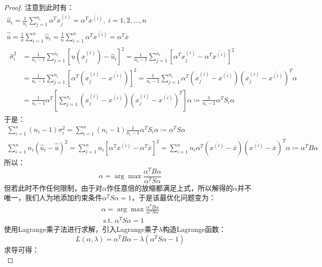 \begin{proof}
	注意到此时有：
	\begin{gather*}
		\hat{u}_i=\frac{1}{n_i}\sum_{j=1}^{n_i}\alpha^Tx^{(i)}_j=\alpha^T\overline{x^{(i)}},\;i=1,2,\dots,n \\
		\hat{\overline{u}}=\frac{1}{n}\sum_{i=1}^{n}\hat{u}_i=\frac{1}{n}\sum_{i=1}^{n}\alpha^T\overline{x^{(i)}}=\alpha^T\overline{x} \\
		\begin{aligned}
			\hat{\sigma}_i^2
			&=\frac{1}{n_i-1}\sum_{j=1}^{n_i}[u(x^{(i)}_j)-\hat{u}_i]^2=\frac{1}{n_i-1}\sum_{j=1}^{n_i}[\alpha^Tx^{(i)}_j-\alpha^T\overline{x^{(i)}}]^2 \\
			&=\frac{1}{n_i-1}\sum_{j=1}^{n_i}[\alpha^T(x^{(i)}_j-\overline{x^{(i)}})]^2=\frac{1}{n_i-1}\sum_{j=1}^{n_i}\alpha^T(x^{(i)}_j-\overline{x^{(i)}})(x^{(i)}_j-\overline{x^{(i)}})^T\alpha \\
			&=\frac{1}{n_i-1}\alpha^T\left[\sum_{j=1}^{n_i}(x^{(i)}_j-\overline{x^{(i)}})(x^{(i)}_j-\overline{x^{(i)}})^T\right]\alpha\coloneqq\frac{1}{n_i-1}\alpha^TS_i\alpha
		\end{aligned}
	\end{gather*}
	于是：
	\begin{gather*}
		\sum_{i=1}^{n}(n_i-1)\sigma_i^2=\sum_{i=1}^{n}(n_i-1)\frac{1}{n_i-1}\alpha^TS_i\alpha\coloneqq\alpha^TS\alpha \\
		\sum_{i=1}^{n}n_i(\hat{u}_i-\hat{\overline{u}})^2=\sum_{i=1}^{n}n_i[\alpha^T\overline{x^{(i)}}-\alpha^T\overline{x}]^2=\sum_{i=1}^{n}n_i\alpha^T(\overline{x^{(i)}}-\overline{x})(\overline{x^{(i)}}-\overline{x})^T\alpha\coloneqq\alpha^TB\alpha
	\end{gather*}
	所以：
	\begin{equation*}
		\alpha=\arg\max\frac{\alpha^TB\alpha}{\alpha^TS\alpha}
	\end{equation*}
	但若此时不作任何限制，由于对$\alpha$作任意倍的放缩都满足上式，所以解得的$\alpha$并不唯一，我们人为地添加约束条件$\alpha^TS\alpha=1$，于是该最优化问题变为：
	\begin{gather*}
		\alpha=\arg\max\frac{\alpha^TB\alpha}{\alpha^TS\alpha} \\
		\operatorname{s.t.}\alpha^TS\alpha=1
	\end{gather*}
	使用Lagrange乘子法进行求解，引入Lagrange乘子$\lambda$构造Lagrange函数：
	\begin{equation*}
		L(\alpha,\lambda)=\alpha^TB\alpha-\lambda(\alpha^TS\alpha-1)
	\end{equation*}
	求导可得：
	\begin{equation*}

\end{equation*}
\end{proof}
